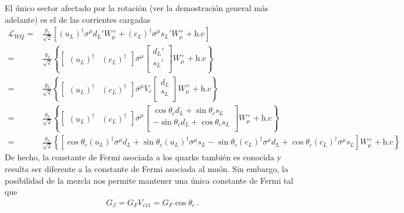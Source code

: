 El único sector afectado por la rotación (ver la demostración general más adelante) es el de las corrientes cargadas
\begin{align}
  \mathcal{L}_{WQ}=&\frac{g_2}{\sqrt{2}}\left[(u_L)^\dagger \overline{\sigma}^\mu d_L'W_\mu^++
  (c_L)^\dagger \overline{\sigma}^\mu s_L'W_\mu^++\text{h.c}\right] \nonumber\\
=&\frac{g_2}{\sqrt{2}}\left\{
  \begin{bmatrix}
 (u_L)^\dagger &  (c_L)^\dagger
  \end{bmatrix}
 \overline{\sigma}^\mu
  \begin{bmatrix}
    d_L' \\
    s_L'\\
  \end{bmatrix}
W_\mu^++\text{h.c}\right\} \nonumber\\
=&\frac{g_2}{\sqrt{2}}\left\{
  \begin{bmatrix}
 (u_L)^\dagger &  (c_L)^\dagger
  \end{bmatrix}
 \overline{\sigma}^\mu
  V_c\begin{bmatrix}
    d_L \\
    s_L\\
  \end{bmatrix}
W_\mu^++\text{h.c}\right\}\nonumber\\
=&\frac{g_2}{\sqrt{2}}\left\{
  \begin{bmatrix}
 (u_L)^\dagger &  (c_L)^\dagger
  \end{bmatrix}
 \overline{\sigma}^\mu
  \begin{bmatrix}
    \cos\theta_c d_L+\sin\theta_c s_L\\
    -\sin\theta_c d_L+ \cos\theta_c s_L\\
  \end{bmatrix}
W_\mu^++\text{h.c}\right\} \nonumber\\
=&\frac{g_2}{\sqrt{2}}\left\{
 \left[    \cos\theta_c(u_L)^\dagger  \overline{\sigma}^\mu  d_L
   + \sin\theta_c (u_L)^\dagger  \overline{\sigma}^\mu s_L
   - \sin\theta_c (c_L)^\dagger  \overline{\sigma}^\mu d_L
   + \cos\theta_c (c_L)^\dagger \overline{\sigma}^\mu    s_L
\right]W_\mu^++\text{h.c}\right\}
\end{align}
De hecho, la constante de Fermi asociada a los quarks también es conocida y resulta ser diferente a la constante de Fermi asociada al muón. Sin embargo, la posibilidad de la mezcla nos permite mantener una única constante de Fermi tal que
\begin{align}
  G_\beta=G_F V_{c11}=G_F\cos\theta_c\,.
\end{align}

